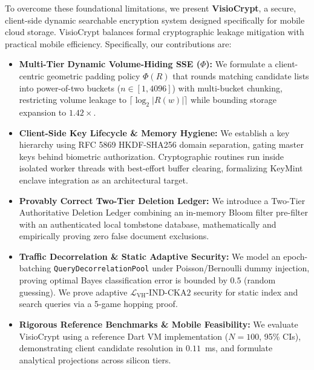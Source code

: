 \documentclass[10pt,conference]{IEEEtran}
\begin{document}
To overcome these foundational limitations, we present \textbf{VisioCrypt}, a secure, client-side dynamic searchable encryption system designed specifically for mobile cloud storage. VisioCrypt balances formal cryptographic leakage mitigation with practical mobile efficiency. Specifically, our contributions are:
\begin{itemize}\setlength{\itemsep}{1pt}\setlength{\parskip}{0pt}
    \item \textbf{Multi-Tier Dynamic Volume-Hiding SSE ($\Phi$):} We formulate a client-centric geometric padding policy $\Phi(R)$ that rounds matching candidate lists into power-of-two buckets ($n \in [1, 4096]$) with multi-bucket chunking, restricting volume leakage to $\lceil \log_2 |R(w)| \rceil$ while bounding storage expansion to $1.42\times$.
    \item \textbf{Client-Side Key Lifecycle \& Memory Hygiene:} We establish a key hierarchy using RFC 5869 HKDF-SHA256 domain separation, gating master keys behind biometric authorization. Cryptographic routines run inside isolated worker threads with best-effort buffer clearing, formalizing KeyMint enclave integration as an architectural target.
    \item \textbf{Provably Correct Two-Tier Deletion Ledger:} We introduce a Two-Tier Authoritative Deletion Ledger combining an in-memory Bloom filter pre-filter with an authenticated local tombstone database, mathematically and empirically proving zero false document exclusions.
    \item \textbf{Traffic Decorrelation \& Static Adaptive Security:} We model an epoch-batching \texttt{QueryDecorrelationPool} under Poisson/Bernoulli dummy injection, proving optimal Bayes classification error is bounded by $0.5$ (random guessing). We prove adaptive $\mathcal{L}_{\text{VH}}\text{-IND-CKA2}$ security for static index and search queries via a 5-game hopping proof.
    \item \textbf{Rigorous Reference Benchmarks \& Mobile Feasibility:} We evaluate VisioCrypt using a reference Dart VM implementation ($N=100$, 95\% CIs), demonstrating client candidate resolution in $0.11$~ms, and formulate analytical projections across silicon tiers.
\end{itemize}
\end{document}
